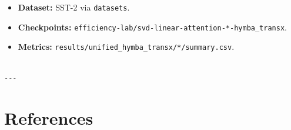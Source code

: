 \begin{itemize}
\item \textbf{Dataset:} SST-2 via \texttt{datasets}.
\item \textbf{Checkpoints:} \texttt{efficiency-lab/svd-linear-attention-*-hymba\_transx}.
\item \textbf{Metrics:} \texttt{results/unified\_hymba\_transx/*/summary.csv}.
\end{itemize}
\begin{lstlisting}

---
\end{lstlisting}

\section{References}

